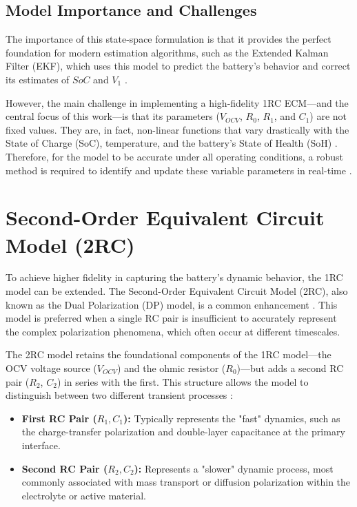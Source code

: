 \documentclass[]{article}
\begin{document}
\subsection{Model Importance and Challenges}
The importance of this state-space formulation is that it provides the perfect foundation for modern estimation algorithms, such as the Extended Kalman Filter (EKF), which uses this model to predict the battery's behavior and correct its estimates of $SoC$ and $V_1$ \cite{xie2023state, pai2023online}.

However, the main challenge in implementing a high-fidelity 1RC ECM—and the central focus of this work—is that its parameters ($V_{OCV}$, $R_0$, $R_1$, and $C_1$) are not fixed values. They are, in fact, non-linear functions that vary drastically with the State of Charge (SoC), temperature, and the battery's State of Health (SoH) \cite{tran2021comprehensive}. Therefore, for the model to be accurate under all operating conditions, a robust method is required to identify and update these variable parameters in real-time \cite{yang2023improved, pai2023online}.

\section{Second-Order Equivalent Circuit Model (2RC)}

To achieve higher fidelity in capturing the battery's dynamic behavior, the 1RC model can be extended. The Second-Order Equivalent Circuit Model (2RC), also known as the Dual Polarization (DP) model, is a common enhancement \cite{tekin2024comparative, khalfi2021electric}. This model is preferred when a single RC pair is insufficient to accurately represent the complex polarization phenomena, which often occur at different timescales.

The 2RC model retains the foundational components of the 1RC model—the OCV voltage source ($V_{OCV}$) and the ohmic resistor ($R_0$)—but adds a second RC pair ($R_2$, $C_2$) in series with the first. This structure allows the model to distinguish between two different transient processes \cite{tran2021comprehensive}:
\begin{itemize}
	\item \textbf{First RC Pair ($R_1, C_1$):} Typically represents the "fast" dynamics, such as the charge-transfer polarization and double-layer capacitance at the primary interface.
	
	\item \textbf{Second RC Pair ($R_2, C_2$):} Represents a "slower" dynamic process, most commonly associated with mass transport or diffusion polarization within the electrolyte or active material.
\end{itemize}
\end{document}
